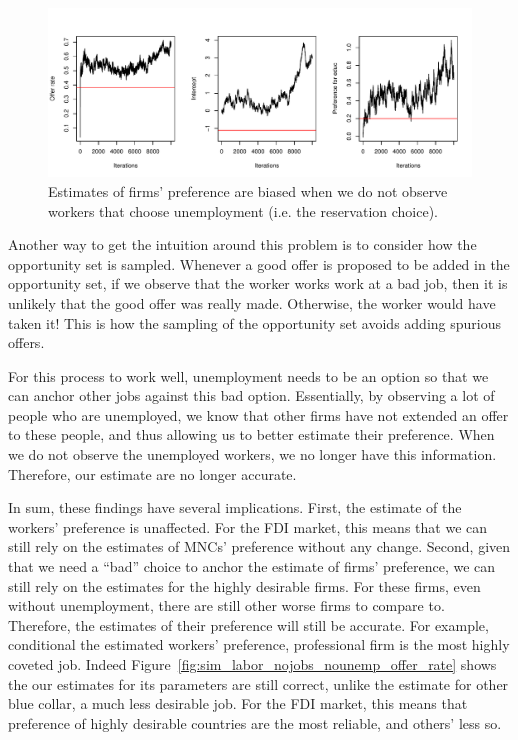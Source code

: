 \begin{figure}[tbp]
  \centering
  \includegraphics[width=\textwidth,keepaspectratio]{../figure/sim_labor_nojobs_nounemp_managerial}
  \caption[Estimates of firms' preference when the reservation choice is
  unobserved.]{Estimates of firms' preference are biased when we do not observe
    workers that choose unemployment (i.e. the reservation choice).}
  \label{fig:sim_labor_nojobs_nounemp_managerial}
\end{figure}

Another way to get the intuition around this problem is to consider how the
opportunity set is sampled. Whenever a good offer is proposed to be added in the
opportunity set, if we observe that the worker works work at a bad job, then it
is unlikely that the good offer was really made. Otherwise, the worker would
have taken it! This is how the sampling of the opportunity set avoids adding
spurious offers.

For this process to work well, unemployment needs to be an option so that we can
anchor other jobs against this bad option. Essentially, by observing a lot of
people who are unemployed, we know that other firms have not extended an offer
to these people, and thus allowing us to better estimate their preference. When
we do not observe the unemployed workers, we no longer have this information.
Therefore, our estimate are no longer accurate.

In sum, these findings have several implications. First, the estimate of the
workers' preference is unaffected. For the FDI market, this means that we can
still rely on the estimates of MNCs' preference without any change. Second,
given that we need a ``bad'' choice to anchor the estimate of firms' preference,
we can still rely on the estimates for the highly desirable firms. For these
firms, even without unemployment, there are still other worse firms to compare
to. Therefore, the estimates of their preference will still be accurate. For
example, conditional the estimated workers' preference, professional firm is the
most highly coveted job. Indeed
Figure~\ref{fig:sim_labor_nojobs_nounemp_offer_rate} shows the our estimates for
its parameters are still correct, unlike the estimate for other blue collar, a
much less desirable job. For the FDI market, this means that preference of
highly desirable countries are the most reliable, and others' less so.

